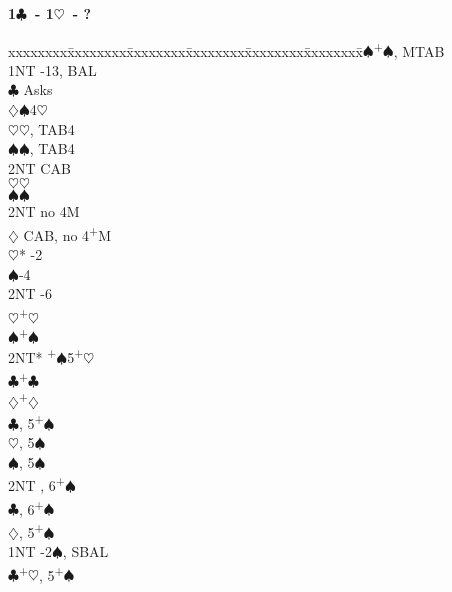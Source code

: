 \documentclass[10pt]{article}
\renewcommand{\c}{$\clubsuit$}
\renewcommand{\d}{$\diamondsuit$}
\newcommand{\h}{$\heartsuit$}
\newcommand{\s}{$\spadesuit$}
\newcommand{\p}{\textsuperscript{+}}
\newenvironment{bidtable}[1][]
{\textbf{#1}
  \begin{adjustwidth}{1em}{}
    \addvspace{2pt}
    \begin{tabbing}
      xxxxxxxx\=xxxxxxxx\=xxxxxxxx\=xxxxxxxx\=xxxxxxxx\=xxxxxxxx\=\kill}
{\end{tabbing}\end{adjustwidth}\bigskip}%
\begin{document}
\begin{multicols*}{2}
\begin{bidtable}[1\c\ - 1\h\ - ?]
1\s {}\p\s, MTAB                                  \\
    \> 1NT -13, BAL                            \\
    \>     \c  \> Asks                          \\
    \>     \>      \d       {}\s 4\h          \\
    \>     \>      \>           \h {}\h, TAB4 \\
    \>     \>      \>           \s {}\s, TAB4 \\
    \>     \>      \>           \> 2NT \> CAB       \\
    \>     \>      \h       {}\h              \\
    \>     \>      \s       {}\s              \\
    \>     \>      \> 2NT       \> no 4M            \\
    \>     \d  \> CAB, no 4\p M                 \\
    \>     \>      \h*      {}-2              \\
    \>     \>      \s       {}-4              \\
    \>     \>      \> 2NT       -6              \\
    \>     \h  {}\p\h                         \\
    \>     \s  {}\p\s                         \\
    \>     \> 2NT* \p\s 5\p\h                   \\
    \>     \c  {}\p\c                         \\
    \>     \d  {}\p\d                         \\
    \c {}, 5\p\s                              \\
    \h {}, 5\s                                \\
    \s {}, 5\s                                \\
    \> 2NT , 6\p\s                              \\
    \c {}, 6\p\s                              \\
    \d {}, 5\p\s                              \\
1NT -2\s, SBAL                                  \\
    \c {}\p\h, 5\p\s                          \\

\end{bidtable}
\end{multicols*}
\end{document}
